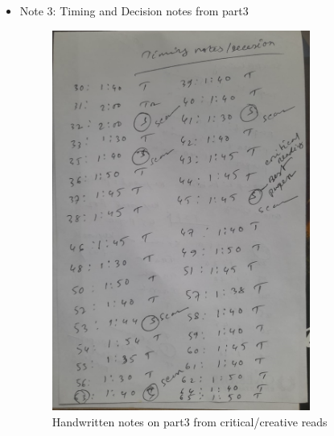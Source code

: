 \documentclass{article}
\begin{document}
\begin{itemize}
    \item Note 3: Timing and Decision notes from part3
    \begin{figure}[ht]
        \centering
        \includegraphics[width=0.8\textwidth]{handnote2.jpg} %
        \caption{Handwritten notes on part3 from critical/creative reads}
        \label{fig:notes}
    \end{figure}
\end{itemize}

\nocite{*}  %
\printbibliography
\end{document}

